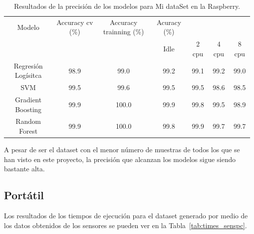 \documentclass[a4paper, 12pt]{book}
\begin{document}
\begin{table}[]
\begin{adjustbox}{width=\textwidth}
\centering
    \begin{tabular}{c  c  c  c  c  c  c}
    \hline
    Modelo & Accuracy cv (\%) & Accuracy trainning (\%) & Acuracy (\%) & & & \\
    \cline{4-7}
     &  &   &  Idle & 2 cpu & 4 cpu & 8 cpu \\
     \hline
     Regresión Logísitca & 98.9 & 99.0 & 99.2 & 99.1 & 99.2 & 99.0\\
     SVM & 99.5 & 99.6 & 99.5 & 99.5 & 98.6 & 98.5\\
     Gradient Boosting & 99.9 & 100.0 & 99.9 & 99.8 & 99.5 & 98.9\\
     Random Forest & 99.9 & 100.0 & 99.8 & 99.9 & 99.7 & 99.7\\
    \hline
    \end{tabular}
\end{adjustbox}
\caption{Resultados de la precisión de los modelos para Mi dataSet en la Raspberry.}
\label{tab:acc_sensrasp}
\end{table}

A pesar de ser el dataset con el menor número de muestras de todos los que se han visto en este proyecto, la precisión que alcanzan los modelos sigue siendo bastante alta.

\subsection{Portátil}
\label{subsec:pc_sensados}

Los resultados de los tiempos de ejecución para el dataset generado por medio de los datos obtenidos de los sensores se pueden ver en la Tabla~\ref{tab:times_senspc}.
\end{document}
